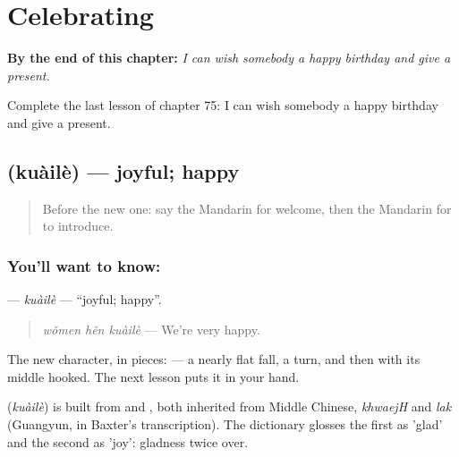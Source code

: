 
\chapter{Celebrating}
\label{ch:zh-celebrating}

\begin{chapteropening}
\textbf{By the end of this chapter:} \emph{I can wish somebody a happy birthday and give a present.}

Complete the last lesson of chapter 75: I can wish somebody a happy birthday and give a present.
\end{chapteropening}

\section[\texorpdfstring{\zh{快乐} (kuàilè)}{快乐 (kuàilè)}]{ (kuàilè) — joyful; happy}

\label{lesson:ZH-C75-kuaile}



\begin{quote}
Before the new one: say the Mandarin for welcome, then the Mandarin for to introduce.
\end{quote}

\subsection*{You'll want to know: }
\textbf{} — \emph{kuàilè} — \textquotedblleft{}joyful; happy\textquotedblright{}.

\begin{quote}
\textbf{} \emph{wǒmen hěn kuàilè} — We're very happy.
\end{quote}

The new character, in pieces:  — a nearly flat fall, a turn, and then  with its middle hooked. The next lesson puts it in your hand.

\begin{cousinweb}
\textbf{} (\emph{kuàilè}) is built from  and , both inherited from Middle Chinese, \emph{khwaejH} and \emph{lak} (Guangyun, in Baxter's transcription). The dictionary glosses the first as 'glad' and the second as 'joy': gladness twice over.
\end{cousinweb}

